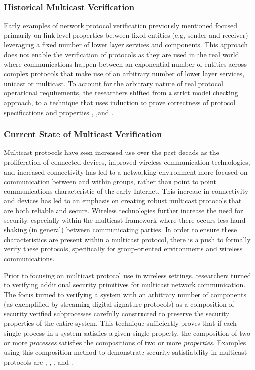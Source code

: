 \documentclass[10pt, journal]{IEEEtran}
\begin{document}
\subsubsection{Historical Multicast Verification}
Early examples of network protocol verification previously mentioned focused primarily on link level properties between fixed entities (e.g, sender and receiver) leveraging a fixed number of lower layer services and components. This approach does not enable the verification of protocols as they are used in the real world where communications happen between an exponential number of entities across complex protocols that make use of an arbitrary number of lower layer services, unicast or multicast. To account for the arbitrary nature of real protocol operational requirements, the researchers shifted from a strict model checking approach, to a technique that uses induction to prove correctness of protocol specifications and properties \cite{Creese1999}, \cite{Callahan1995} ,and \cite{Baptista1990}.

\subsubsection{Current State of Multicast Verification}
Multicast protocols have seen increased use over the past decade as the proliferation of connected devices, improved wireless communication technologies, and increased connectivity has led to a networking environment more focused on communication between and within groups, rather than point to point communications characteristic of the early Internet. This increase in connectivity and devices has led to an emphasis on creating robust multicast protocols that are both reliable and secure. Wireless technologies further increase the need for security, especially within the multicast framework where there occurs less hand-shaking (in general) between communicating parties. In order to ensure these characteristics are present within a multicast protocol, there is a push to formally verify these protocols, specifically for group-oriented environments and wireless communications. 

Prior to focusing on multicast protocol use in wireless settings, researchers turned to verifying additional security primitives for multicast network communication. The focus turned to verifying a system with an arbitrary number of components (as exemplified by streaming digital signature protocols) as a composition of security verified subprocesses carefully constructed to preserve the security properties of the entire system. This technique sufficiently proves that if each single process in a system satisfies a given single property, the composition of two or more \textit{processes} satisfies the compositions of two or more \textit{properties}. Examples using this composition method to demonstrate security satisfiability in multicast protocols are \cite{Gorrieri2008}, \cite{Martina2015}, \cite{Bella2002}, and \cite{Archer2002}.
\end{document}
